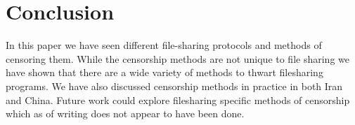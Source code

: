 \section{Conclusion}\label{sec:conclusion}

In this paper we have seen different file-sharing protocols and methods of
censoring them. While the censorship methods are not unique to file sharing we
have shown that there are a wide variety of methods to thwart filesharing
programs. We have also discussed censorship methods in practice in both Iran and
China. Future work could explore filesharing specific methods of censorship
which as of writing does not appear to have been done.
